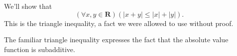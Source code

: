 \documentclass[fleqn, 12pt,answers]{exam}
\newcommand{\reals}{\mathbf{R}}
\begin{document}
\begin{questions}
\begin{solution} We'll show that
  \begin{equation*}
    \left(\forall x,y \in \reals \right) \left( |x+y|  \leq  |x| + |y|  \right).
    \end{equation*}
This is the triangle inequality, a fact we were allowed to use without proof.

The familiar triangle inequality expresses the fact that the absolute value function is subadditive.
\end{solution}




\end{questions}
\end{document}
